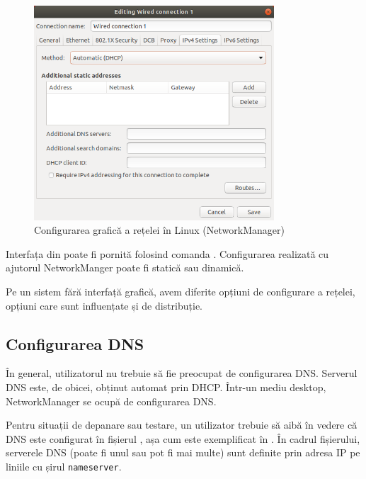 \begin{figure}[!htbp]
  \centering
  \includegraphics[width=0.8\textwidth]{chapters/11-net/img/nm-gui.png}
  \caption{Configurarea grafică a rețelei în Linux (NetworkManager)}
  \label{fig:net:nm-gui}
\end{figure}

Interfața din  poate fi pornită folosind comanda .
Configurarea realizată cu ajutorul NetworkManger poate fi statică sau dinamică.

Pe un sistem fără interfață grafică, avem diferite opțiuni de configurare a rețelei, opțiuni care sunt influențate și de distribuție.

\subsection{Configurarea DNS}
\label{sec:net:linux-config:dns}

În general, utilizatorul nu trebuie să fie preocupat de configurarea DNS.
Serverul DNS este, de obicei, obținut automat prin DHCP.
Într-un mediu desktop, NetworkManager se ocupă de configurarea DNS.

Pentru situații de depanare sau testare, un utilizator trebuie să aibă în vedere că DNS este configurat în fișierul , așa cum este exemplificat în .
În cadrul fișierului, serverele DNS (poate fi unul sau pot fi mai multe) sunt definite prin adresa IP pe liniile cu șirul \texttt{nameserver}.


